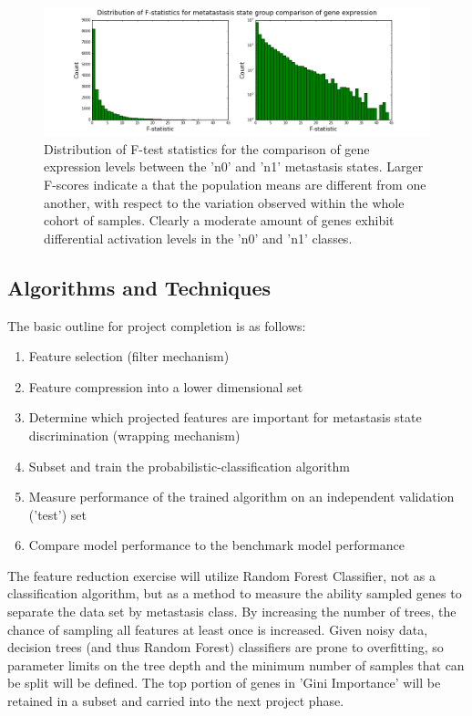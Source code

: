 \documentclass[final]{article}
\begin{document}
\begin{figure}[h!]
  \centering
  \includegraphics[width = \textwidth]{FDist}
  \caption{Distribution of F-test statistics for the comparison of gene expression
  levels between the 'n0' and 'n1' metastasis states.\label{fig:FDist}  Larger F-scores
  indicate a that the population means are different from one another, with respect to the
  variation observed within the whole cohort of samples.  Clearly a moderate amount of
  genes exhibit differential activation levels in the 'n0' and 'n1' classes.}
\end{figure}

\subsection{Algorithms and Techniques}

The basic outline for project completion is as follows:
\begin{enumerate}
\item Feature selection (filter mechanism)
\item Feature compression into a lower dimensional set
\item Determine which projected features are important for metastasis state discrimination (wrapping mechanism)
\item Subset and train the probabilistic-classification algorithm
\item Measure performance of the trained algorithm on an independent validation ('test') set
\item Compare model performance to the benchmark model performance
\end{enumerate}

The feature reduction exercise will utilize Random Forest Classifier, not as a
classification algorithm, but as a method to measure the ability sampled genes
to separate the data set by metastasis class.  By increasing the number of
trees, the  chance of sampling all features at least once is increased.  Given
noisy data, decision trees (and thus Random Forest) classifiers are prone to
overfitting, so parameter limits on the tree depth and the minimum number of
samples that can be split will be defined. The top portion of genes in 'Gini
Importance' will be retained in a subset and carried into the next project
phase.
\end{document}
